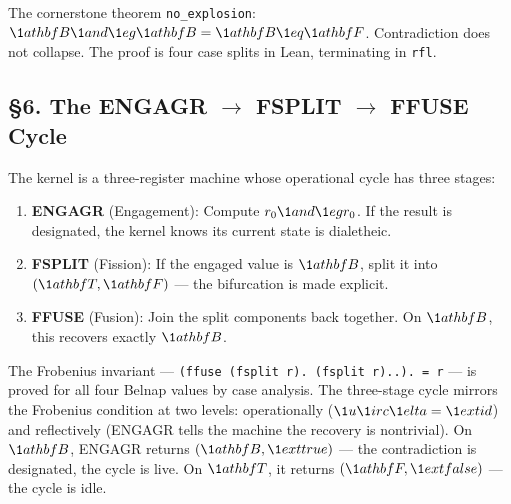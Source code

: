 \documentclass[10pt,a4paper]{article}
\newcommand{\pilcrow}{\S}
\begin{document}
The cornerstone theorem \texttt{no\_\allowbreak explosion}: $\\\1athbf{B} \\\1and \\\1eg \\\1athbf{B} = \\\1athbf{B} \\\1eq \\\1athbf{F}$. Contradiction does not collapse. The proof is four case splits in Lean, terminating in \texttt{rfl}.

\subsection{\pilcrow{}6. The ENGAGR $\rightarrow$ FSPLIT $\rightarrow$ FFUSE Cycle}

The kernel is a three-register machine whose operational cycle has three stages:

\begin{enumerate}
    \item \textbf{ENGAGR} (Engagement): Compute $r_0 \\\1and \\\1eg r_0$. If the result is designated, the kernel knows its current state is dialetheic.
    \item \textbf{FSPLIT} (Fission): If the engaged value is $\\\1athbf{B}$, split it into $(\\\1athbf{T}, \\\1athbf{F})$ --- the bifurcation is made explicit.
    \item \textbf{FFUSE} (Fusion): Join the split components back together. On $\\\1athbf{B}$, this recovers exactly $\\\1athbf{B}$.
\end{enumerate}

The Frobenius invariant --- \texttt{(ffuse (fsplit r). (fsplit r)..). = r} --- is proved for all four Belnap values by case analysis. The three-stage cycle mirrors the Frobenius condition at two levels: operationally ($\\\1u \\\1irc \\\1elta = \\\1ext{id}$) and reflectively (ENGAGR tells the machine the recovery is nontrivial). On $\\\1athbf{B}$, ENGAGR returns $(\\\1athbf{B}, \\\1ext{true})$ --- the contradiction is designated, the cycle is live. On $\\\1athbf{T}$, it returns $(\\\1athbf{F}, \\\1ext{false})$ --- the cycle is idle.
\end{document}
